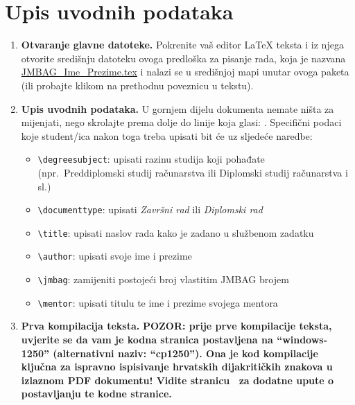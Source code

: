 \section{Upis uvodnih podataka}
\begin{enumerate}
	\item {\color{red} \textbf{Otvaranje glavne datoteke.}} Pokrenite vaš editor \LaTeX{} teksta i iz njega otvorite središnju datoteku ovoga predloška za pisanje rada, koja je nazvana \href{run:JMBAG\_Ime\_Prezime.tex}{{\color{blue}JMBAG\_Ime\_Prezime.tex}} i nalazi se u središnjoj mapi unutar ovoga paketa (ili probajte klikom na prethodnu poveznicu u tekstu).
	\item {\color{red} \textbf{Upis uvodnih podataka.}} U gornjem dijelu dokumenta nemate ništa za mijenjati, nego skrolajte prema dolje do linije koja glasi: \verb||. Specifični podaci koje student/ica nakon toga treba upisati bit će uz sljedeće naredbe:
	\begin{itemize}
		\item \verb|\degreesubject|: upisati razinu studija koji pohađate (npr.\ Preddiplomski studij računarstva ili Diplomski studij računarstva i sl.)
		\item \verb|\documenttype|: upisati \emph{Završni rad} ili \emph{Diplomski rad}
		\item \verb|\title|: upisati naslov rada kako je zadano u službenom zadatku
		\item \verb|\author|: upisati svoje ime i prezime
		\item \verb|\jmbag|: zamijeniti postojeći broj vlastitim JMBAG brojem 
		\item \verb|\mentor|: upisati titulu te ime i prezime svojega mentora
	\end{itemize}
	\item {\color{red} \textbf{Prva kompilacija teksta.}} \label{encoding2} \textbf{POZOR: prije prve kompilacije teksta, uvjerite se da vam je kodna stranica postavljena na ``windows-1250'' (alternativni naziv: ``cp1250''). Ona je kod kompilacije ključna za ispravno ispisivanje hrvatskih dijakritičkih znakova u izlaznom PDF dokumentu! Vidite stranicu~\pageref{encoding1} za dodatne upute o postavljanju te kodne stranice.} 
	

\end{enumerate}

